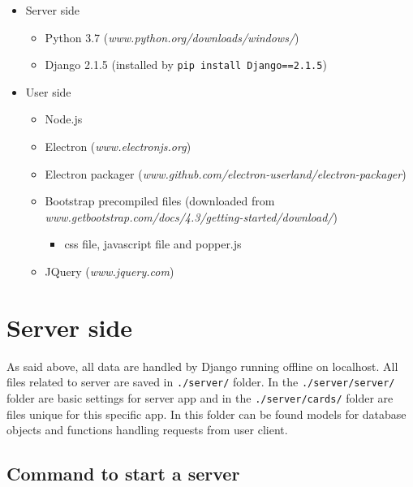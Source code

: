 \documentclass[12pt]{article}
\providecommand{\tightlist}{\setlength{\itemsep}{1pt}\setlength{\parskip}{1pt}}
\let\oldtexttt\texttt
\renewcommand{\texttt}[1]{\oldtexttt{\textcolor{codehighlight}{#1}}}
\begin{document}
\begin{itemize}
\tightlist
\item
  Server side

  \begin{itemize}
  \tightlist
  \item
    Python 3.7 (\emph{www.python.org/downloads/windows/})
  \item
    Django 2.1.5 (installed by \texttt{pip\ install\ Django==2.1.5})
  \end{itemize}
\item
  User side

  \begin{itemize}
  \tightlist
  \item
    Node.js
  \item
    Electron (\emph{www.electronjs.org})
  \item
    Electron packager
    (\emph{www.github.com/electron-userland/electron-packager})
  \item
    Bootstrap precompiled files (downloaded from
    \emph{www.getbootstrap.com/docs/4.3/getting-started/download/})

    \begin{itemize}
    \tightlist
    \item
      css file, javascript file and popper.js
    \end{itemize}
  \item
    JQuery (\emph{www.jquery.com})
  \end{itemize}
\end{itemize}

\hypertarget{server-side}{%
\section{Server side}\label{server-side}}

As said above, all data are handled by Django running offline on
localhost. All files related to server are saved in \texttt{./server/}
folder. In the \texttt{./server/server/} folder are basic settings for
server app and in the \texttt{./server/cards/} folder are files unique
for this specific app. In this folder can be found models for database
objects and functions handling requests from user client.

\hypertarget{command-to-start-a-server}{%
\subsection{Command to start a server}\label{command-to-start-a-server}}
\end{document}
